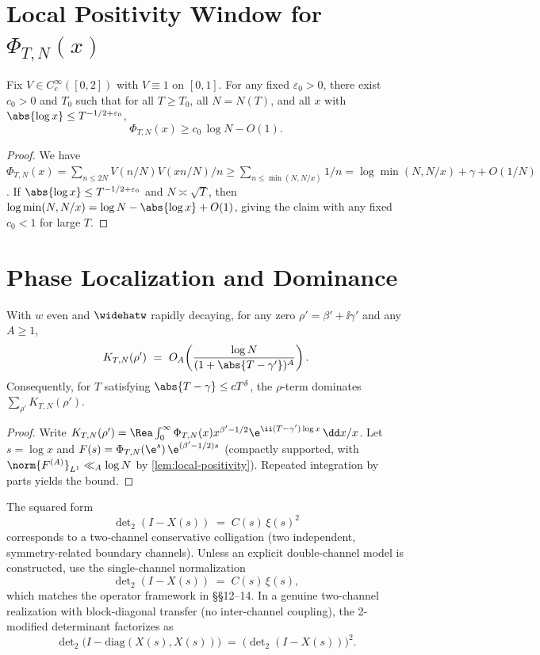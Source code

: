 \section{Local Positivity Window for \texorpdfstring{$\Phi_{T,N}(x)$}{Phi}} \label{app:local-positivity}
\begin{lemma}\label{lem:local-positivity}
Fix $V\in C_c^\infty([0,2])$ with $V\equiv1$ on $[0,1]$. For any fixed $\varepsilon_0>0$, there exist $c_0>0$ and $T_0$ such that for all $T\ge T_0$, all $N=N(T)$, and all $x$ with $\abs{\log x}\le T^{-1/2+\varepsilon_0}$,
\[
\Phi_{T,N}(x)\ge c_0\,\log N - O(1).
\]
\end{lemma}
\begin{proof}
We have $\Phi_{T,N}(x)=\sum_{n\le 2N} V(n/N)V(xn/N)/n\ge \sum_{n\le \min(N,N/x)}1/n=\log \min(N,N/x)+\gamma + O(1/N)$. If $\abs{\log x}\le T^{-1/2+\varepsilon_0}$ and $N\asymp\sqrt{T}$, then $\log \min(N,N/x)=\log N-\abs{\log x}+O(1)$, giving the claim with any fixed $c_0<1$ for large $T$.
\end{proof}

\section{Phase Localization and Dominance} \label{app:phase-localization}
\begin{lemma}\label{lem:phase-localization}
With $w$ even and $\widehatw$ rapidly decaying, for any zero $\rho'=\beta'+\ii\gamma'$ and any $A\ge1$,
\[
K_{T,N}(\rho')\ =\ O_A\!\left(\frac{\log N}{(1+\abs{T-\gamma'})^A}\right).
\]
Consequently, for $T$ satisfying $\abs{T-\gamma}\le cT^\delta$, the $\rho$-term dominates $\sum_{\rho'} K_{T,N}(\rho')$.
\end{lemma}

\begin{proof}
Write $K_{T,N}(\rho')=\Rea\int_0^\infty \Phi_{T,N}(x)x^{\beta'-1/2}\e^{\ii(T-\gamma')\log x}\,\dd x/x$. Let $s=\log x$ and $F(s)=\Phi_{T,N}(\e^s)\,\e^{(\beta'-1/2)s}$ (compactly supported, with $\norm{F^{(A)}}_{L^1}\ll_A \log N$ by \cref{lem:local-positivity}). Repeated integration by parts yields the bound.
\end{proof}
\begin{remark}\label{rem:channel-multiplicity}
The squared form
\[
\det\nolimits_{2}(I-X(s)) \;=\; C(s)\,\xi(s)^{2}
\]
corresponds to a two\mbox{-}channel conservative colligation (two independent, symmetry-related boundary channels). 
Unless an explicit double\mbox{-}channel model is constructed, use the single\mbox{-}channel normalization
\[
\det\nolimits_{2}(I-X(s)) \;=\; C(s)\,\xi(s),
\]
which matches the operator framework in §§12–14. In a genuine two\mbox{-}channel realization with block-diagonal transfer (no inter-channel coupling), the 2\mbox{-}modified determinant factorizes as
\[
\det\nolimits_{2}\!\big(I-\mathrm{diag}(X(s),X(s))\big)\;=\;\big(\det\nolimits_{2}(I-X(s))\big)^{2}.
\]
\end{remark}

